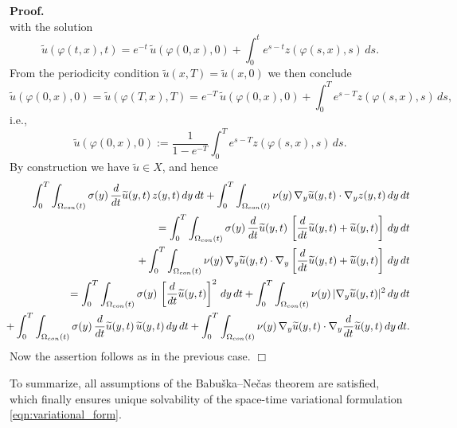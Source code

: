 \documentclass[12pt]{article}
\newenvironment{proof}{\textbf{Proof.}}{\hfill $\Box$}
\numberwithin{equation}{section}
\begin{document}
\begin{proof}
\[  \]
  with the solution
  \[
    \widetilde{u}(\varphi(t,x),t)
    = e^{-t} \,
    \widetilde{u}(\varphi(0,x),0)
    +
    \int_0^t e^{s-t} z(\varphi(s,x),s) \, ds .
  \]
  From the periodicity condition $\widetilde{u}(x,T) = \widetilde{u}(x,0)$
  we then conclude
  \[
    \widetilde{u}(\varphi(0,x),0)
    =
    \widetilde{u}(\varphi(T,x),T)
    = e^{-T} \, \widetilde{u}(\varphi(0,x),0)
    +
    \int_0^T e^{s-T} z(\varphi (s,x),s) \, ds ,
  \]
  i.e.,
  \[
    \widetilde{u}(\varphi(0,x),0)
    := \frac{1}{1-e^{-T}}
    \int_0^T e^{s-T} z(\varphi
    (s,x),s) \, ds .
  \]
  By construction we have $\widetilde{u} \in X$, and hence
  \begin{eqnarray*}
    && \int_0^T \int_{\Omega_{con}(t)}
    \sigma(y) \, \frac{d}{dt} \widetilde{u}(y,t) \, z(y,t) \, dy \, dt +
    \int_0^T \int_{\Omega_{con}(t)} \nu(y) \,
    \nabla_y \widetilde{u}(y,t) \cdot \nabla_y z(y,t) \,
       dy \, dt \\
    && \hspace*{0.5cm}
       = \int_0^T \int_{\Omega_{con}(t)}
       \sigma(y) \, \frac{d}{dt} \widetilde{u}(y,t) \,
       \left[ \frac{d}{dt} \widetilde{u}(y,t) + \widetilde{u}(y,t)
       \right] \, dy \, dt \\
    && \hspace*{1cm} +
       \int_0^T \int_{\Omega_{con}(t)} \nu(y) \,
       \nabla_y \widetilde{u}(y,t) \cdot \nabla_y \left[
       \frac{d}{dt} \widetilde{u}(y,t) + \widetilde{u}(y,t)
       \right] \, dy \, dt \\
    && \hspace*{0.5cm}
       = \int_0^T \int_{\Omega_{con}(t)}
       \sigma(y) \,
       \left[ \frac{d}{dt} \widetilde{u}(y,t) 
       \right]^2 \, dy \, dt
       +
       \int_0^T \int_{\Omega_{con}(t)} \nu(y) \,
       |\nabla_y \widetilde{u}(y,t)|^2 \, dy \, dt \\
    && \hspace*{-5mm} +
       \int_0^T \int_{\Omega_{con}(t)}
       \sigma(y) \, \frac{d}{dt} \widetilde{u}(y,t) \,
       \widetilde{u}(y,t) \, dy \, dt +
       \int_0^T \int_{\Omega_{con}(t)} \nu(y) \,
       \nabla_y \widetilde{u}(y,t) \cdot \nabla_y 
       \frac{d}{dt} \widetilde{u}(y,t) \, dy \, dt .
  \end{eqnarray*}
Now the assertion follows as in the previous case.
\end{proof}

To summarize, all assumptions of the Babu\v ska--Ne\v cas theorem
\cite{BaAz72,ErnGuermond:2004,Ne62} are satisfied, which finally ensures unique
solvability of the space-time variational formulation
\eqref{eqn:variational_form}.
\end{document}
